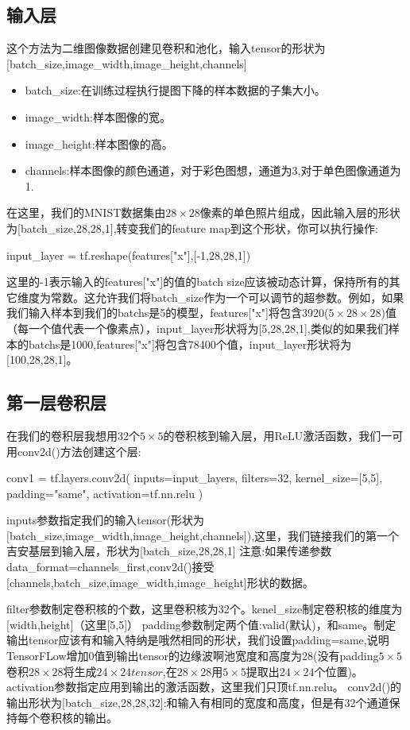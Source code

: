 \subsection{输入层}
 这个方法为二维图像数据创建见卷积和池化，输入tensor的形状为[batch\_size,image\_width,image\_height,channels]
\begin{itemize}
\item batch\_size:在训练过程执行提图下降的样本数据的子集大小。
\item image\_width:样本图像的宽。
\item image\_height:样本图像的高。
\item channels:样本图像的颜色通道，对于彩色图想，通道为3,对于单色图像通道为1.
\end{itemize}
在这里，我们的MNIST数据集由$28\times28$像素的单色照片组成，因此输入层的形状为[batch\_size,28,28,1],转变我们的feature map到这个形状，你可以执行操作:
\begin{python}
input_layer = tf.reshape(features["x"],[-1,28,28,1])
\end{python}
这里的-1表示输入的features["x"]的值的batch size应该被动态计算，保持所有的其它维度为常数。这允许我们将batch\_size作为一个可以调节的超参数。例如，如果我们输入样本到我们的batchs是5的模型，features["x"]将包含3920($5\times28\times28$)值（每一个值代表一个像素点），input\_layer形状将为[5,28,28,1],类似的如果我们样本的batchs是1000,features["x"]将包含78400个值，input\_layer形状将为[100,28,28,1]。
\subsection{第一层卷积层}
在我们的卷积层我想用32个$5\times5$的卷积核到输入层，用ReLU激活函数，我们一可用conv2d()方法创建这个层:
\begin{python}
conv1 = tf.layers.conv2d(
    inputs=input_layers,
    filters=32,
    kernel_size=[5,5],
    padding="same",
    activation=tf.nn.relu
)
\end{python}
\begin{displayquote}
inputs参数指定我们的输入tensor(形状为[batch\_size,image\_width,image\_height,channels]),这里，我们链接我们的第一个吉安基层到输入层，形状为[batch\_size,28,28,1]
注意:如果传递参数data\_format=channels\_first,conv2d()接受[channels,batch\_size,image\_width,image\_height]形状的数据。
\end{displayquote}
filter参数制定卷积核的个数，这里卷积核为32个。kenel\_size制定卷积核的维度为[width,height]（这里[5,5]）
padding参数制定两个值:valid(默认)，和same。制定输出tensor应该有和输入特纳是哦然相同的形状，我们设置padding=same,说明TensorFLow增加0值到输出tensor的边缘波啊池宽度和高度为28(没有padding$5\times5$卷积$28\times28$将生成$24\times24tensor$,在$28\times28$用$5\times5$提取出$24\times24$个位置)。
activation参数指定应用到输出的激活函数，这里我们只顶tf.nn.relu。
conv2d()的输出形状为[batch\_size,28,28,32]:和输入有相同的宽度和高度，但是有32个通道保持每个卷积核的输出。
